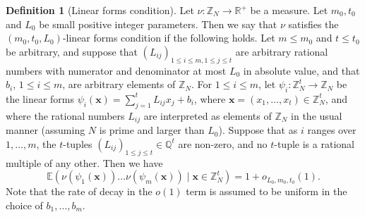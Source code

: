\documentclass[12pt,a4paper,reqno]{amsart}
\numberwithin{equation}{section}
\theoremstyle{plain}
\theoremstyle{definition}
\newtheorem{definition}[subsection]{Definition}
\renewcommand{\leq}{\leqslant}
\def\Z{{\mathbb Z}}
\def\Q{{\mathbb Q}}
\begin{document}
\begin{definition}[Linear forms condition]\label{linear-forms-condition}
Let $\nu : \mathbb{Z}_N \rightarrow \mathbb{R}^{+}$ be a measure. Let $m_0,t_0$ and $L_0$ be small positive integer parameters. Then we say that $\nu$ satisfies the $(m_0,t_0,L_0)$-linear forms condition if the following holds. Let $m \leq m_0$ and $t \leq t_0$ be arbitrary, and suppose that $( L_{ij} )_{1 \leq i \leq m, 1 \leq j \leq t}$ are arbitrary rational numbers with numerator and denominator at most $L_0$ in absolute value, and that $b_i$, $1 \leq i \leq m$, are arbitrary elements of $\mathbb{Z}_N$.  For $1 \leq i \leq m$, let $\psi_i: \Z_N^t \to \Z_N$ be the linear forms $\psi_i(\mathbf{x}) = \sum_{j = 1}^t L_{ij}x_j + b_i$, where $\mathbf{x} = (x_1,\dots,x_t) \in \mathbb{Z}_N^t$, and where the rational numbers $L_{ij}$ are interpreted as elements of $\Z_N$ in the usual manner (assuming $N$ is prime and larger than $L_0$). Suppose that as $i$ ranges over $1,\ldots,m$, the $t$-tuples $(L_{ij})_{1 \leq j \leq t} \in \Q^t$ are non-zero, and no $t$-tuple is a rational multiple of any other.
Then we have 
\begin{equation}\label{lfc}
 \mathbb{E}\left( \nu(\psi_1(\mathbf{x})) \dots \nu(\psi_m(\mathbf{x})) \;|\; \mathbf{x} \in \mathbb{Z}_N^t \right) = 1 + o_{L_0,m_0,t_0}(1).
\end{equation}
Note that the rate of decay in the $o(1)$ term is assumed to be uniform in the choice of $b_1, \ldots, b_m$.
\end{definition}
\end{document}
